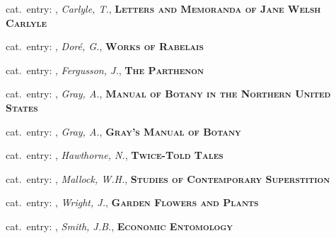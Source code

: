 \vbox{%
  \vspace*{0.5 cm}
  \noindent
  {\footnotesize{}\hspace{1em}cat.~entry: , \textit{Carlyle, T.}, \textsc{\bfseries Letters and Memoranda of Jane Welsh Carlyle}}
}


\vbox{%
  \vspace*{0.5 cm}
  \noindent
  {\footnotesize{}\hspace{1em}cat.~entry: , \textit{Doré, G.}, \textsc{\bfseries Works of Rabelais}}
}

\vbox{%
  \vspace*{0.5 cm}
  \noindent
  {\footnotesize{}\hspace{1em}cat.~entry: , \textit{Fergusson, J.}, \textsc{\bfseries The Parthenon}}
}

\vbox{%
  \vspace*{0.5 cm}
  \noindent
  {\footnotesize{}\hspace{1em}cat.~entry: , \textit{Gray, A.}, \textsc{\bfseries Manual of Botany in the Northern United States}}
}

\vbox{%
  \vspace*{0.5 cm}
  \noindent
  {\footnotesize{}\hspace{1em}cat.~entry: , \textit{Gray, A.}, \textsc{\bfseries Gray’s Manual of Botany}}
}

\vbox{%
  \vspace*{0.5 cm}
  \noindent
  {\footnotesize{}\hspace{1em}cat.~entry: , \textit{Hawthorne, N.}, \textsc{\bfseries Twice-Told Tales}}
}

\vbox{%
  \vspace*{0.5 cm}
  \noindent
  {\footnotesize{}\hspace{1em}cat.~entry: , \textit{Mallock, W.H.}, \textsc{\bfseries Studies of Contemporary Superstition}}
}

\vbox{%
  \vspace*{0.5 cm}
  \noindent
  {\footnotesize{}\hspace{1em}cat.~entry: , \textit{Wright, J.}, \textsc{\bfseries Garden Flowers and Plants}}
}

\vbox{%
  \vspace*{0.5 cm}
  \noindent
  {\footnotesize{}\hspace{1em}cat.~entry: , \textit{Smith, J.B.}, \textsc{\bfseries Economic Entomology}}
}

